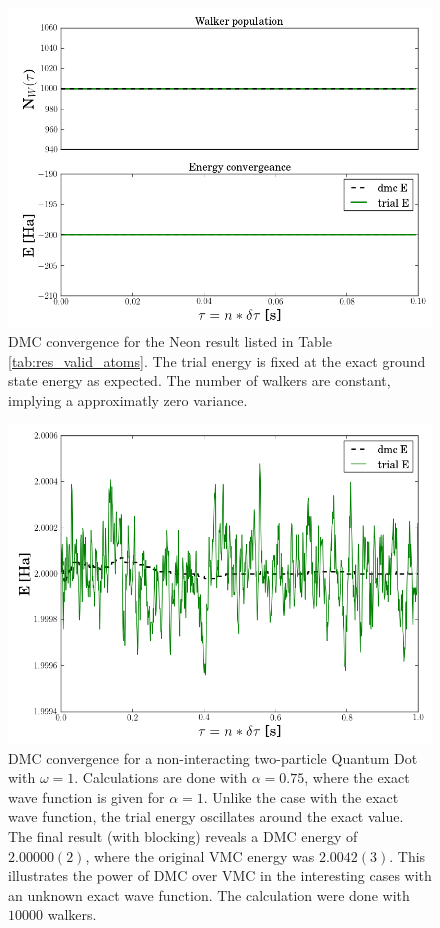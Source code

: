 \begin{figure}[h]
 \begin{center}
  \includegraphics[scale=0.5]{../Graphics/DMC_neon_valid.png}
  \caption{DMC convergence for the Neon result listed in Table \ref{tab:res_valid_atoms}. The trial energy is fixed at the exact ground state energy as expected. The number of walkers are constant, implying a approximatly zero variance.}
  \label{fig:DMC_neon_nonint}
 \end{center}
\end{figure}

\begin{figure}[h]
 \begin{center}
  \includegraphics[scale=0.5]{../Graphics/DMC_notExactWF.png}
  \caption{DMC convergence for a non-interacting two-particle Quantum Dot with $\omega=1$. Calculations are done with $\alpha=0.75$, where the exact wave function is given for $\alpha=1$. Unlike the case with the exact wave function, the trial energy oscillates around the exact value. The final result (with blocking) reveals a DMC energy of $2.00000(2)$, where the original VMC energy was $2.0042(3)$. This illustrates the power of DMC over VMC in the interesting cases with an unknown exact wave function. The calculation were done with $10000$ walkers.}
  \label{fig:DMC_nonExactWF}
 \end{center}
\end{figure}